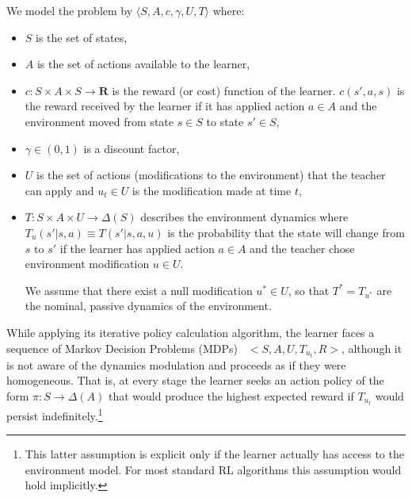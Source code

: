 \documentclass[letterpaper]{aamas2009}
\begin{document}
We model the problem by $\langle S, A, c,\gamma, U,T\rangle$ where:
%
\begin{itemize}
\item $S$ is the set of states, 
\item $A$ is the set of actions available to the learner,
\item  $c:S\times A\times S\rightarrow\mathbf{R}$ is the reward (or
  cost) function of the learner. $c(s',a,s)$ is the reward received by
  the learner if it has applied action $a\in A$ and the environment
  moved from state $s\in S$ to state $s'\in S$,
\item $\gamma \in (0,1)$ is a discount factor,   

\item $U$ is the set of actions (modifications to the environment)  that the teacher can apply and $u_t\in U$ is the modification made at time $t$, 

\item $T:S\times A\times U\rightarrow\Delta(S)$ describes the environment dynamics where 
$T_u(s'|s,a)\equiv T(s'|s,a,u)$ is the probability that the state will change from $s$ to $s'$ if the learner has
  applied action $a\in A$ and the teacher chose  environment
  modification $u\in U$.

 
We assume that there exist a null
  modification $u^*\in U$, so that $T^*=T_{u^*}$ are the nominal,
  passive dynamics of the environment.
\end{itemize}

While applying its iterative policy calculation algorithm, the learner
faces a sequence of Markov Decision Problems (MDPs)~\cite{puterman_book_94}
$<S,A,U,T_{u_t},R>$, although it is not aware of the dynamics
modulation and proceeds as if they were homogeneous. That is, at every
stage the learner seeks an action policy of the form
$\pi:S\rightarrow\Delta(A)$ that would produce the highest expected
reward if $T_{u_t}$ would persist indefinitely.\footnote{This latter
  assumption is explicit only if the learner actually has access to
  the environment model. For most standard RL algorithms this
  assumption would hold implicitly.}
\end{document}
